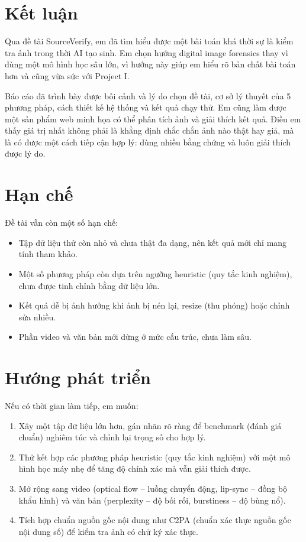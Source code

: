 \documentclass[14pt,a4paper,oneside]{report}
\begin{document}
\section{Kết luận}
Qua đề tài SourceVerify, em đã tìm hiểu được một bài toán khá thời sự là kiểm tra ảnh trong thời AI tạo sinh. Em chọn hướng digital image forensics thay vì dùng một mô hình học sâu lớn, vì hướng này giúp em hiểu rõ bản chất bài toán hơn và cũng vừa sức với Project I.

Báo cáo đã trình bày được bối cảnh và lý do chọn đề tài, cơ sở lý thuyết của 5 phương pháp, cách thiết kế hệ thống và kết quả chạy thử. Em cũng làm được một sản phẩm web minh họa có thể phân tích ảnh và giải thích kết quả. Điều em thấy giá trị nhất không phải là khẳng định chắc chắn ảnh nào thật hay giả, mà là có được một cách tiếp cận hợp lý: dùng nhiều bằng chứng và luôn giải thích được lý do.

\section{Hạn chế}
Đề tài vẫn còn một số hạn chế:
\begin{itemize}
  \item Tập dữ liệu thử còn nhỏ và chưa thật đa dạng, nên kết quả mới chỉ mang tính tham khảo.
  \item Một số phương pháp còn dựa trên ngưỡng heuristic (quy tắc kinh nghiệm), chưa được tinh chỉnh bằng dữ liệu lớn.
  \item Kết quả dễ bị ảnh hưởng khi ảnh bị nén lại, resize (thu phóng) hoặc chỉnh sửa nhiều.
  \item Phần video và văn bản mới dừng ở mức cấu trúc, chưa làm sâu.
\end{itemize}

\section{Hướng phát triển}
Nếu có thời gian làm tiếp, em muốn:
\begin{enumerate}
  \item Xây một tập dữ liệu lớn hơn, gán nhãn rõ ràng để benchmark (đánh giá chuẩn) nghiêm túc và chỉnh lại trọng số cho hợp lý.
  \item Thử kết hợp các phương pháp heuristic (quy tắc kinh nghiệm) với một mô hình học máy nhẹ để tăng độ chính xác mà vẫn giải thích được.
  \item Mở rộng sang video (optical flow -- luồng chuyển động, lip-sync -- đồng bộ khẩu hình) và văn bản (perplexity -- độ bối rối, burstiness -- độ bùng nổ).
  \item Tích hợp chuẩn nguồn gốc nội dung như C2PA (chuẩn xác thực nguồn gốc nội dung số) để kiểm tra ảnh có chữ ký xác thực.
\end{enumerate}
\end{document}
